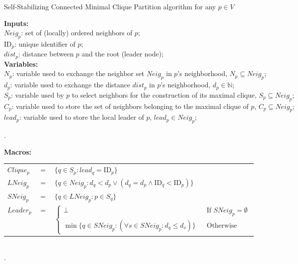 \documentclass[11pt,letterpaper,onecolumn]{article}
\newcommand{\N}{\mathds{N}}
\newcommand{\id}{\mbox{ID}}
\begin{document}
\begin{algorithm}[t]
\caption{\quad Self-Stabilizing Connected Minimal Clique Partition algorithm for any $p \in V$\label{algo}}
\smallskip
\begin{scriptsize}
{\bf Inputs:}\\
\hspace*{1cm}$Neig_p$: set of (locally) ordered neighbors of $p$;\\
\hspace*{1cm}$\id_p$: unique identifier of $p$;\\
\hspace*{1cm}$dist_p$: distance between $p$ and the root (leader node);\\
{\bf Variables:}\\
\hspace*{1cm}$N_p$: variable used to exchange the neighbor set $Neig_p$ in $p$'s neighborhood, $N_p \subseteq Neig_p$;\\
\hspace*{1cm}$d_p$: variable used to exchange the distance $dist_p$ in $p$'s neighborhood, $d_p \in \N$;\\
\hspace*{1cm}$S_p$: variable used by $p$ to select neighbors for the construction of its maximal clique, $S_p \subseteq Neig_p$;\\
\hspace*{1cm}$C_p$: variable used to store the set of neighbors belonging to the maximal clique of $p$, $C_p \subseteq Neig_p$;\\
\hspace*{1cm}$lead_p$: variable used to store the local leader of $p$, $lead_p \in Neig_p$;

.\dotfill\ 

{\bf Macros:}\\
\begin{tabular}{lll}
$Clique_p$ & $=$ & $\{q \in S_p: lead_q=\id_p\}$\\
$LNeig_p$ & $=$ & $\{q \in Neig_p: d_q<d_p \vee (d_q=d_p \wedge \id_q < \id_p)\}$\\
$SNeig_p$ & $=$ & $\{q \in LNeig_p: p \in S_q\}$\\
$Leader_p$ & $=$ & $\left\{\begin{array}{lll}\bot & & \mbox{If }SNeig_p=\emptyset\\ \min \{q \in SNeig_p: (\forall s \in SNeig_p: d_q \leq d_s)\} & & \mbox{Otherwise}\end{array}\right.$\\
\end{tabular}\\
.\dotfill\


\end{scriptsize}
\end{algorithm}
\end{document}
